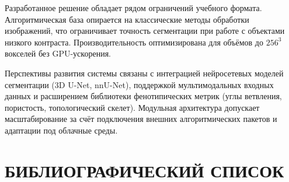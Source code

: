 \documentclass[14pt,a4paper]{extreport}
\begin{document}
Разработанное решение обладает рядом ограничений учебного формата. Алгоритмическая база опирается на классические методы обработки изображений, что ограничивает точность сегментации при работе с объектами низкого контраста. Производительность оптимизирована для объёмов до $256^3$ вокселей без GPU-ускорения.

Перспективы развития системы связаны с интеграцией нейросетевых моделей сегментации (3D U-Net, nnU-Net), поддержкой мультимодальных входных данных и расширением библиотеки фенотипических метрик (углы ветвления, пористость, топологический скелет). Модульная архитектура допускает масштабирование за счёт подключения внешних алгоритмических пакетов и адаптации под облачные среды.

\newpage

\chapter*{БИБЛИОГРАФИЧЕСКИЙ СПИСОК}
\end{document}
